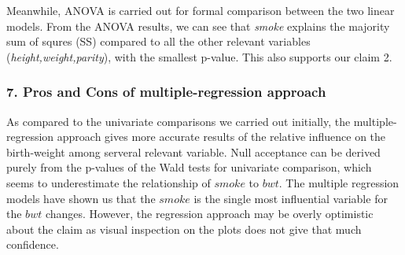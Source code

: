 \documentclass{article}
\begin{document}
Meanwhile, ANOVA is carried out for formal comparison between the two
linear models. From the ANOVA results, we can see that \textit{smoke}
explains the majority sum of squres (SS) compared to all the other
relevant variables (\textit{height,weight,parity}), with the smallest
p-value. This also supports our claim 2.


\subsubsection*{7. Pros and Cons of multiple-regression approach}
\hspace{12 pt} As compared to the univariate comparisons we carried
out initially, the multiple-regression approach gives more accurate
results of the relative influence on the birth-weight among serveral
relevant variable. Null acceptance can be derived purely from the p-values of the Wald
tests for univariate comparison, which seems to underestimate the
relationship of $smoke$ to $bwt$. The multiple regression models have
shown us that the $smoke$ is the single most influential variable for
the $bwt$ changes. However, the regression approach may be overly
optimistic about the claim as visual inspection on the plots does not
give that much confidence.

 
\end{document}
